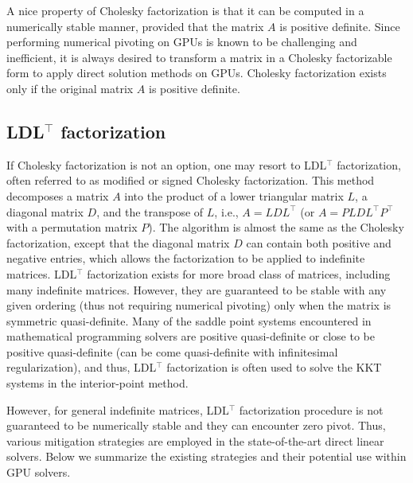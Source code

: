 \documentclass{article}
\begin{document}
A nice property of Cholesky factorization is that it can be computed in a numerically stable manner, provided that the matrix $A$ is positive definite.
Since performing numerical pivoting on GPUs is known to be challenging and inefficient, it is always desired to transform a matrix in a Cholesky factorizable form to apply direct solution methods on GPUs.
Cholesky factorization exists only if the original matrix $A$ is positive definite.



\subsection{LDL$^\top$ factorization}
If Cholesky factorization is not an option, one may resort to LDL$^\top$ factorization, often referred to as modified or signed Cholesky factorization.
This method decomposes a matrix $A$ into the product of a lower triangular matrix $L$, a diagonal matrix $D$, and the transpose of $L$, i.e., $A = L D L^\top$ (or $A = P L D L^\top P^\top$ with a permutation matrix $P$).
The algorithm is almost the same as the Cholesky factorization, except that the diagonal matrix $D$ can contain both positive and negative entries, which allows the factorization to be applied to indefinite matrices.
LDL$^\top$ factorization exists for more broad class of matrices, including many indefinite matrices.
However, they are guaranteed to be stable with any given ordering (thus not requiring numerical pivoting) only when the matrix is symmetric quasi-definite.
Many of the saddle point systems encountered in mathematical programming solvers are positive quasi-definite or close to be positive quasi-definite (can be come quasi-definite with infinitesimal regularization), and thus, LDL$^\top$ factorization is often used to solve the KKT systems in the interior-point method.

However, for general indefinite matrices, LDL$^\top$ factorization procedure is not guaranteed to be numerically stable and they can encounter zero pivot.
Thus, various mitigation strategies are employed in the state-of-the-art direct linear solvers.
Below we summarize the existing strategies and their potential use within GPU solvers.
\end{document}
